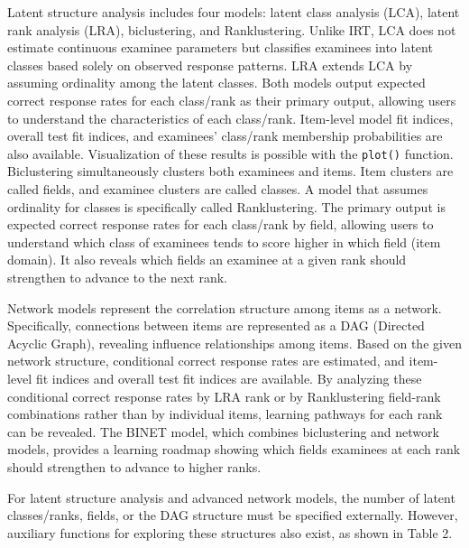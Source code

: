Latent structure analysis includes four models: latent class analysis (LCA), latent rank analysis (LRA), biclustering, and Ranklustering. Unlike IRT, LCA does not estimate continuous examinee parameters but classifies examinees into latent classes based solely on observed response patterns. LRA extends LCA by assuming ordinality among the latent classes. Both models output expected correct response rates for each class/rank as their primary output, allowing users to understand the characteristics of each class/rank. Item-level model fit indices, overall test fit indices, and examinees' class/rank membership probabilities are also available. Visualization of these results is possible with the \texttt{plot()} function. Biclustering simultaneously clusters both examinees and items. Item clusters are called fields, and examinee clusters are called classes. A model that assumes ordinality for classes is specifically called Ranklustering. The primary output is expected correct response rates for each class/rank by field, allowing users to understand which class of examinees tends to score higher in which field (item domain). It also reveals which fields an examinee at a given rank should strengthen to advance to the next rank.

Network models represent the correlation structure among items as a network. Specifically, connections between items are represented as a DAG (Directed Acyclic Graph), revealing influence relationships among items. Based on the given network structure, conditional correct response rates are estimated, and item-level fit indices and overall test fit indices are available. By analyzing these conditional correct response rates by LRA rank or by Ranklustering field-rank combinations rather than by individual items, learning pathways for each rank can be revealed. The BINET model, which combines biclustering and network models, provides a learning roadmap showing which fields examinees at each rank should strengthen to advance to higher ranks.

For latent structure analysis and advanced network models, the number of latent classes/ranks, fields, or the DAG structure must be specified externally. However, auxiliary functions for exploring these structures also exist, as shown in Table 2.

